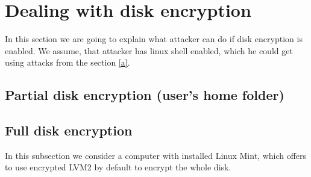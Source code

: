\section{Dealing with disk encryption}
In this section we are going to explain what attacker can do if disk encryption is enabled. We assume, that attacker has linux shell enabled, which he could get using attacks from the section \ref{a}.

\subsection{Partial disk encryption (user's home folder)}



\subsection{Full disk encryption}\label{fde}
In this subsection we consider a computer with installed Linux Mint, which offers to use encrypted LVM2 by default to encrypt the whole disk.

